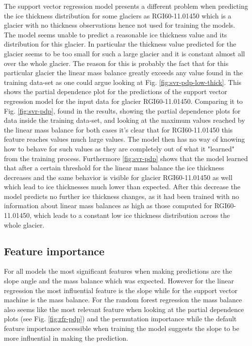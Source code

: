 The support vector regression model presents a different problem when predicting the ice thickness distribution for some glaciers as RGI60-11.01450 which is a glacier with no thickness observations hence not used for training the models. The model seems unable to predict a reasonable ice thickness value and its distribution for this glacier. In particular the thickness value predicted for the glacier seems to be too small for such a large glacier and it is constant almost all over the whole glacier. The reason for this is probably the fact that for this particular glacier the linear mass balance greatly exceeds any value found in the training data-set as one could argue looking at Fig. \ref{fig:svr-pdp-low-thick}. This shows the partial dependence plot for the predictions of the support vector regression model for the input data for glacier RGI60-11.01450. Comparing it to Fig. \ref{fig:svr-pdp}, found in the results, showing the partial dependence plots for data inside the training data-set, and looking at the maximum values reached by  the linear mass balance for both cases it's clear that for RGI60-11.01450 this feature reaches values much large values. The model then has no way of knowing how to behave for such values as they are completely out of what it "learned" from the training process. Furthermore \ref{fig:svr-pdp} shows that the model learned that after a certain threshold for the linear mass balance the ice thickness decreases and the same behavior is visible for glacier RGI60-11.01450 as well which lead to ice thicknesses much lower than expected. After this decrease the model predicts no further ice thickness changes, as it had been trained with no information about linear mass balances as high as those computed for RGI60-11.01450, which leads to a constant low ice thickness distribution across the whole glacier.


\subsection{Feature importance}\label{disc-features}
For all models the most significant features when making predictions are the slope angle and the mass balance which was expected. However for the linear regression the most influential feature is the slope while for the support  vector machine is the mass balance. For the random forest regression the mass balance also seems like the most relevant feature when looking at the partial dependence plots (see Fig. \ref{fig:rfr-pdp}) and the permutation importance while the default feature importance accessible when training the model suggests the slope to be more influential in making the prediction.

